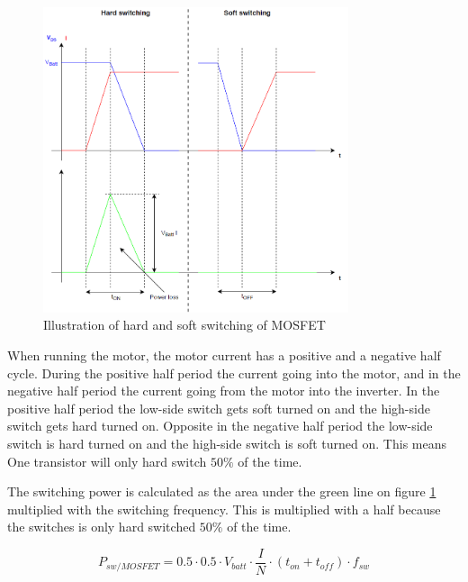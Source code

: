     \begin{figure}[H]
		\centering
		\includegraphics[width=0.8\textwidth]{pictures/hardware/Power_Board/Hard_soft_switching.PNG}
		\caption{Illustration of hard and soft switching of MOSFET}
		\label{fig:HardSoftSwitch}
	\end{figure} 

When running the motor, the motor current has a positive and a negative half cycle. During the positive half period the current going into the motor, and in the negative half period the current going from the motor into the inverter. In the positive half period the low-side switch gets soft turned on and the high-side switch gets hard turned on. Opposite in the negative half period the low-side switch is hard turned on and the high-side switch is soft turned on. This means One transistor will only hard switch $50 \%$ of the time.

The switching power is calculated as the area under the green line on figure \ref{fig:HardSoftSwitch} multiplied with the switching frequency. This is multiplied with a half because the switches is only hard switched $50 \%$ of the time. 

    \begin{equation}
        P_{sw/MOSFET} = 0.5 \cdot 0.5 \cdot V_{batt} \cdot \frac{I}{N} \cdot (t_{on}+t_{off}) \cdot f_{sw}
    \end{equation}



